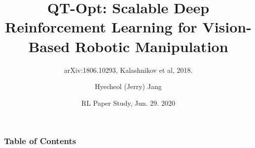 \documentclass{beamer}
\title{QT-Opt: Scalable Deep Reinforcement Learning for Vision-Based Robotic Manipulation}
\subtitle{arXiv:1806.10293, Kalashnikov et al, 2018.}
\author{Hyecheol (Jerry) Jang}
\institute{
  \inst{1}%
  Department of Computer Sciences\\
  University of Wisconsin–Madison
}
\date{RL Paper Study, Jun. 29. 2020}
\begin{document}
  \frame{\titlepage}
  
  \begin{frame}
    \frametitle{Table of Contents}
    \tableofcontents
  \end{frame}
\end{document}
